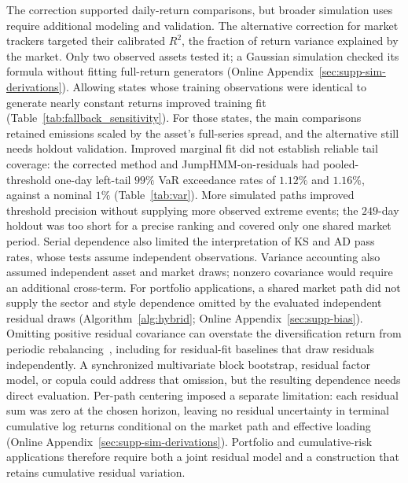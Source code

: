 The correction supported daily-return comparisons, but broader
simulation uses require additional modeling and validation. The alternative
correction for market trackers targeted their calibrated $R^2$, the
fraction of return variance explained by the market. Only two
observed assets tested it; a Gaussian simulation checked its formula
without fitting full-return generators (Online Appendix~\ref{sec:supp-sim-derivations}). Allowing states whose training observations were identical to
generate nearly constant returns improved training fit (Table~\ref{tab:fallback_sensitivity}). For those states, the main comparisons retained emissions scaled
by the asset's full-series spread, and the alternative still needs holdout validation. Improved
marginal fit did not establish reliable tail coverage: the corrected
method and JumpHMM-on-residuals had pooled-threshold one-day left-tail
$99\%$ VaR exceedance rates of $1.12\%$ and $1.16\%$, against a
nominal $1\%$ (Table~\ref{tab:var}). More simulated paths improved
threshold precision without supplying more observed extreme events;
the $249$-day holdout was too short for a precise ranking and covered
only one shared market period. Serial dependence also limited the
interpretation of KS and AD pass rates, whose tests assume independent
observations. Variance accounting also assumed independent asset and market
draws; nonzero covariance would require an additional cross-term.
For portfolio applications,
a shared market path did not supply the sector and style dependence
omitted by the evaluated independent residual draws
(Algorithm~\ref{alg:hybrid}; Online Appendix~\ref{sec:supp-bias}).
Omitting positive residual covariance can overstate the
diversification return from periodic rebalancing~\cite{boothFama1992,
boucheyNemtchinovWong2015, markowitz1976longRun}, including for
residual-fit baselines that draw residuals independently. A
synchronized multivariate block bootstrap, residual factor model, or
copula could address that omission, but the resulting dependence
needs direct evaluation. Per-path centering imposed a separate
limitation: each residual sum was zero at the chosen horizon, leaving
no residual uncertainty in terminal cumulative log returns conditional on
the market path and effective loading (Online
Appendix~\ref{sec:supp-sim-derivations}). Portfolio and cumulative-risk
applications therefore require both a joint residual model and a
construction that retains cumulative residual variation.
